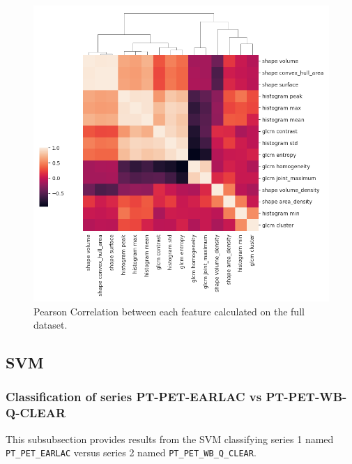 \begin{figure}[H]
    \centering
    \includegraphics[width=1\textwidth]{Figures/feature_correlation.png}
    \caption{Pearson Correlation between each feature calculated on the full
    dataset. }  
    \label{fig:correlation} 
\end{figure}








\subsection{SVM}

\subsubsection{Classification of series PT-PET-EARLAC vs PT-PET-WB-Q-CLEAR}
\label{sec:SVM0}
This subsubsection provides results from the SVM classifying series 1 named \verb|PT_PET_EARLAC|
versus series 2 named \verb|PT_PET_WB_Q_CLEAR|. 

